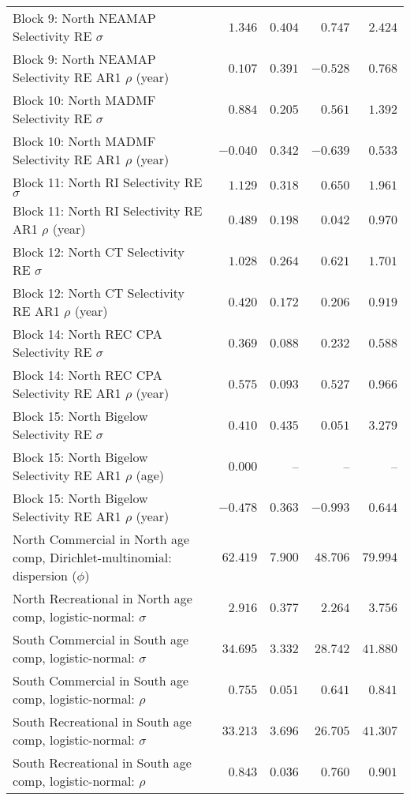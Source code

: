 \documentclass[
]{article}
\begin{document}
\begin{landscape}
\begin{longtable}[t]{lrrrr}
\addlinespace
Block 9: North NEAMAP Selectivity RE $\sigma$ & $1.346$ & $0.404$ & $0.747$ & $2.424$\\
Block 9: North NEAMAP Selectivity RE AR1 $\rho$ (year) & $0.107$ & $0.391$ & $-0.528$ & $0.768$\\
Block 10: North MADMF Selectivity RE $\sigma$ & $0.884$ & $0.205$ & $0.561$ & $1.392$\\
Block 10: North MADMF Selectivity RE AR1 $\rho$ (year) & $-0.040$ & $0.342$ & $-0.639$ & $0.533$\\
Block 11: North RI Selectivity RE $\sigma$ & $1.129$ & $0.318$ & $0.650$ & $1.961$\\
\addlinespace
Block 11: North RI Selectivity RE AR1 $\rho$ (year) & $0.489$ & $0.198$ & $0.042$ & $0.970$\\
Block 12: North CT Selectivity RE $\sigma$ & $1.028$ & $0.264$ & $0.621$ & $1.701$\\
Block 12: North CT Selectivity RE AR1 $\rho$ (year) & $0.420$ & $0.172$ & $0.206$ & $0.919$\\
Block 14: North REC CPA Selectivity RE $\sigma$ & $0.369$ & $0.088$ & $0.232$ & $0.588$\\
Block 14: North REC CPA Selectivity RE AR1 $\rho$ (year) & $0.575$ & $0.093$ & $0.527$ & $0.966$\\
\addlinespace
Block 15: North Bigelow Selectivity RE $\sigma$ & $0.410$ & $0.435$ & $0.051$ & $3.279$\\
Block 15: North Bigelow Selectivity RE AR1 $\rho$ (age) & $0.000$ & -- & -- & --\\
Block 15: North Bigelow Selectivity RE AR1 $\rho$ (year) & $-0.478$ & $0.363$ & $-0.993$ & $0.644$\\
North Commercial in North age comp, Dirichlet-multinomial: dispersion ($\phi$) & $62.419$ & $7.900$ & $48.706$ & $79.994$\\
North Recreational in North age comp, logistic-normal: $\sigma$ & $2.916$ & $0.377$ & $2.264$ & $3.756$\\
\addlinespace
South Commercial in South age comp, logistic-normal: $\sigma$ & $34.695$ & $3.332$ & $28.742$ & $41.880$\\
South Commercial in South age comp, logistic-normal: $\rho$ & $0.755$ & $0.051$ & $0.641$ & $0.841$\\
South Recreational in South age comp, logistic-normal: $\sigma$ & $33.213$ & $3.696$ & $26.705$ & $41.307$\\
South Recreational in South age comp, logistic-normal: $\rho$ & $0.843$ & $0.036$ & $0.760$ & $0.901$\\

\end{longtable}
\end{landscape}
\end{document}
